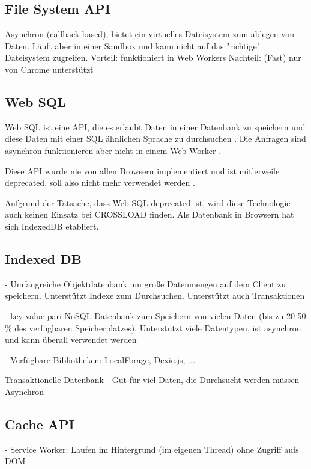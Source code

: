 \subsection{File System API}
Asynchron (callback-based), bietet ein virtuelles Dateisystem zum ablegen von Daten. Läuft aber in einer Sandbox und kann nicht auf das "richtige" Dateisystem zugreifen.
Vorteil: funktioniert in Web Workers 
Nachteil: (Fast) nur von Chrome unterstützt
\autocite{Hajian2019}

\subsection{Web SQL}
Web SQL ist eine \ac{API}, die es erlaubt Daten in einer Datenbank zu speichern und diese Daten mit einer SQL ähnlichen Sprache zu durchsuchen \autocite{w3-web-sql}. Die Anfragen sind asynchron funktionieren aber nicht in einem Web Worker \autocite{Hajian2019}.

Diese \ac{API} wurde nie von allen Browsern implementiert und ist mitlerweile deprecated, soll also nicht mehr verwendet werden \autocite{Hajian2019}.

Aufgrund der Tatsache, dass Web SQL deprecated ist, wird diese Technologie auch keinen Einsatz bei CROSSLOAD finden. Als Datenbank in Browsern hat sich IndexedDB etabliert.

\subsection{Indexed DB}
- Umfangreiche Objektdatenbank um große Datenmengen auf dem Client zu speichern. Unterstützt Indexe zum Durchsuchen. Unterstützt auch Transaktionen \autocite{Sheppard2017} 

- key-value pari NoSQL Datenbank zum Speichern von vielen Daten (bis zu 20-50 \% des verfügbaren Speicherplatzes). Unterstützt viele Datentypen, ist asynchron und kann überall verwendet werden \autocite{Hajian2019}

- Verfügbare Bibliotheken: LocalForage, Dexie.js, ... \autocite{Hajian2019}

Transaktionelle Datenbank
- Gut für viel Daten, die Durchsucht werden müssen
- Asynchron

\subsection{Cache API}
- Service Worker: Laufen im Hintergrund (im eigenen Thread) ohne Zugriff aufs DOM \autocite{Sheppard2017}

